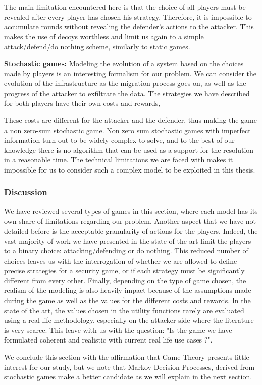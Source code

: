 The main limitation encountered here is that the choice of all players must be revealed after every player has chosen his strategy. Therefore, it is impossible to accumulate rounds without revealing the defender's actions to the attacker. This makes the use of decoys worthless and limit us again to a simple attack/defend/do nothing scheme, similarly to static games.

\textbf{Stochastic games:} Modeling the evolution of a system based on the choices made by players is an interesting formalism for our problem. We can consider the evolution of the infrastructure as the migration process goes on, as well as the progress of the attacker to exfiltrate the data. The strategies we have described for both players have their own costs and rewards, 

These costs are different for the attacker and the defender, thus making the game a non zero-sum stochastic game. Non zero sum stochastic games with imperfect information turn out to be widely complex to solve, and to the best of our knowledge there is no algorithm that can be used as a support for the resolution in a reasonable time. The technical limitations we are faced with makes it impossible for us to consider such a complex model to be exploited in this thesis.


\subsubsection{Discussion}
We have reviewed several types of games in this section, where each model has its own share of limitations regarding our problem. Another aspect that we have not detailed before is the acceptable granularity of actions for the players. Indeed, the vast majority of work we have presented in the state of the art limit the players to a binary choice: attacking/defending or do nothing. This reduced number of choices leaves us with the interrogation of whether we are allowed to define precise strategies for a security game, or if each strategy must be significantly different from every other.
Finally, depending on the type of game chosen, the realism of the modeling is also heavily impact because of the assumptions made during the game as well as the values for the different costs and rewards.
In the state of the art, the values chosen in the utility functions rarely are evaluated using a real life methodology, especially on the attacker side where the literature is very scarce. This leave with us with the question: "Is the game we have formulated coherent and realistic with current real life use cases ?". 

We conclude this section with the affirmation that Game Theory presents little interest for our study, but we note that Markov Decision Processes, derived from stochastic games make a better candidate as we will explain in the next section.



